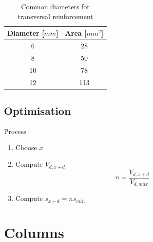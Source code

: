 \documentclass[landscape]{article}
\begin{document}
\begin{multicols*}{2}
\begin{table}[H]
  \centering
  \begin{tabular}{cc}
  \toprule
  Diameter [$mm$] & Area [$mm^2$] \\
  \midrule
  6 & 28 \\
  8 & 50 \\
  10 & 78 \\
  12 & 113 \\
  \bottomrule
  \end{tabular}
  \caption{Common diameters for transversal reinforcement}
  \label{tab:diam_tran}
\end{table}
\subsection{Optimisation} %
\label{sub:optimisation}
Process
\begin{enumerate}
  \item Choose $x$
  \item Compute $V_{d,x+d}$
  \[
    n=\frac{V_{d,x+d}}{V_{d,max}}
  \]
  \item Compute $s_{x+d} = n s_{min}$
\end{enumerate}

\section{Columns} %
\label{sec:columns}

\end{multicols*}
\end{document}
